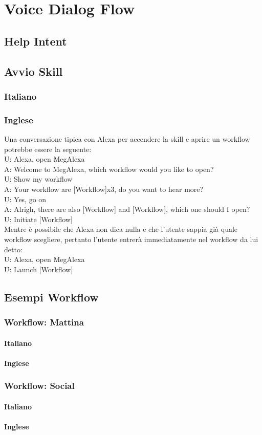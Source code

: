 \chapter{Voice Dialog Flow}

\section{Help Intent}

\section{Avvio Skill}
\subsection{Italiano}

\subsection{Inglese}
Una conversazione tipica con Alexa per accendere la skill e aprire un workflow potrebbe essere la seguente:\\

U: Alexa, open MegAlexa \\
A: Welcome to MegAlexa, which workflow would you like to open?\\
U: Show my workflow\\
A: Your workflow are [Workflow]x3, do you want to hear more?\\
U: Yes, go on\\
A: Alrigh, there are also [Workflow] and [Workflow], which one should I open?\\
U: Initiate [Workflow] \\

Mentre è possibile che Alexa non dica nulla e che l'utente sappia già quale workflow scegliere, pertanto l'utente entrerà immediatamente nel workflow da lui detto: \\
U: Alexa, open MegAlexa\\
U: Launch [Workflow]\\

\section{Esempi Workflow}
\subsection{Workflow: Mattina}
\subsubsection{Italiano}
\subsubsection{Inglese}


\subsection{Workflow: Social}
\subsubsection{Italiano}
\subsubsection{Inglese}